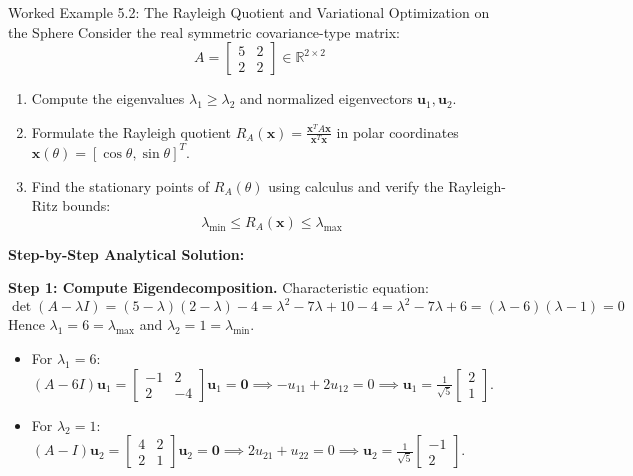 \begin{examplebox}{Worked Example 5.2: The Rayleigh Quotient and Variational Optimization on the Sphere}
\label{ex:w05_rayleigh_quotient}
Consider the real symmetric covariance-type matrix:
\begin{equation}
A = \begin{bmatrix} 5 & 2 \\ 2 & 2 \end{bmatrix} \in \mathbb{R}^{2 \times 2}
\end{equation}
\begin{enumerate}
    \item Compute the eigenvalues $\lambda_1 \ge \lambda_2$ and normalized eigenvectors $\mathbf{u}_1, \mathbf{u}_2$.
    \item Formulate the Rayleigh quotient $R_A(\mathbf{x}) = \frac{\mathbf{x}^T A \mathbf{x}}{\mathbf{x}^T \mathbf{x}}$ in polar coordinates $\mathbf{x}(\theta) = [\cos\theta, \sin\theta]^T$.
    \item Find the stationary points of $R_A(\theta)$ using calculus and verify the Rayleigh-Ritz bounds:
    \begin{equation*}
    \lambda_{\min} \le R_A(\mathbf{x}) \le \lambda_{\max}
    \end{equation*}
\end{enumerate}

\tcblower
\textbf{Step-by-Step Analytical Solution:}

\textbf{Step 1: Compute Eigendecomposition.}
Characteristic equation:
\begin{equation}
\det(A - \lambda I) = (5 - \lambda)(2 - \lambda) - 4 = \lambda^2 - 7\lambda + 10 - 4 = \lambda^2 - 7\lambda + 6 = (\lambda - 6)(\lambda - 1) = 0
\end{equation}
Hence $\lambda_1 = 6 = \lambda_{\max}$ and $\lambda_2 = 1 = \lambda_{\min}$.
\begin{itemize}
    \item For $\lambda_1 = 6$: $(A - 6I)\mathbf{u}_1 = \begin{bmatrix} -1 & 2 \\ 2 & -4 \end{bmatrix}\mathbf{u}_1 = \mathbf{0} \implies -u_{11} + 2u_{12} = 0 \implies \mathbf{u}_1 = \frac{1}{\sqrt{5}}\begin{bmatrix} 2 \\ 1 \end{bmatrix}$.
    \item For $\lambda_2 = 1$: $(A - I)\mathbf{u}_2 = \begin{bmatrix} 4 & 2 \\ 2 & 1 \end{bmatrix}\mathbf{u}_2 = \mathbf{0} \implies 2u_{21} + u_{22} = 0 \implies \mathbf{u}_2 = \frac{1}{\sqrt{5}}\begin{bmatrix} -1 \\ 2 \end{bmatrix}$.
\end{itemize}


\end{examplebox}
